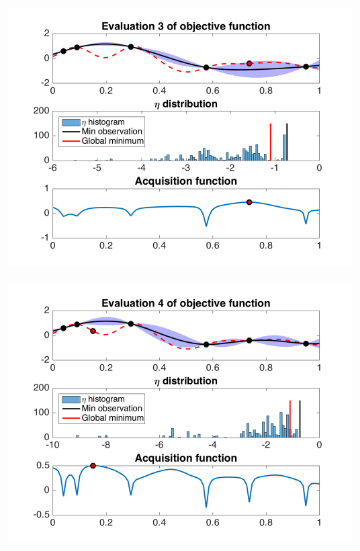 \documentclass[a4paper,11pt]{report}
\begin{document}
\begin{figure} [p]
\begin{subfigure}{.5\textwidth}
		  \centering
		  \includegraphics[width=1\linewidth]{ESBOPA_update_eta_prior_seed6_3.png}
	\end{subfigure}
	\begin{subfigure}{.5\textwidth}
		  \centering
		  \includegraphics[width=1\linewidth]{ESBOPA_update_eta_prior_seed6_4.png}
	\end{subfigure}
	\begin{subfigure}{.5\textwidth}
 		 \centering

\end{subfigure}
\end{figure}
\end{document}
